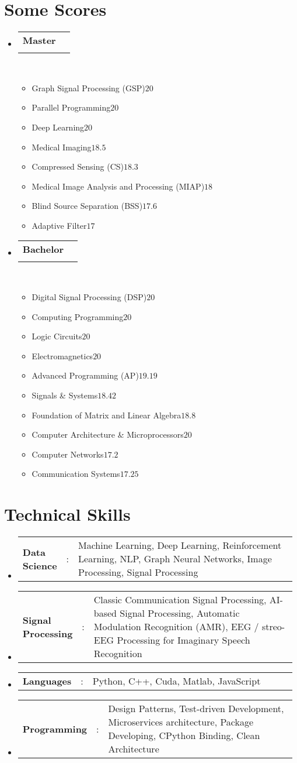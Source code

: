 \documentclass[a4paper,11pt]{article}
\makeatletter
\newcommand{\resumeItemScore}[2]{\item[]\small#1\hfill#2}
\newcommand{\resumeItemListStart}{\begin{itemize}[rightmargin=0.11in]}
\newcommand{\resumeItemListEnd}{\end{itemize}}
\newcommand{\resumeSectionType}[3]{
\item\begin{tabular*}{0.96\textwidth}[t]{
p{0.15\linewidth}p{0.02\linewidth}p{0.81\linewidth}
}
\textbf{#1} & #2 & #3
\end{tabular*}\vspace{-2pt}
}
\newcommand{\resumeQuadHeading}[4]{
\item
\begin{tabular*}{0.96\textwidth}[t]{l@{\extracolsep{\fill}}r}
\textbf{#1} & #2 \\
\textit{\small#3} & \textit{\small #4} \\
\end{tabular*}
}
\newcommand{\resumeHeadingListStart}{
\begin{itemize}[leftmargin=0.15in, label={}]
}
\newcommand{\resumeHeadingListEnd}{\end{itemize}}
\makeatother
\begin{document}
\section{Some Scores}
%
\resumeHeadingListStart{}
\resumeQuadHeading{Master}{}{}{}\\\vspace{-1.5em}

\begin{multicols}{2}
\resumeItemListStart{}
\resumeItemScore{Graph Signal Processing (GSP)}{$20$}
\resumeItemScore{Parallel Programming}{$20$}
\resumeItemScore{Deep Learning}{$20$}
\resumeItemScore{Medical Imaging}{$18.5$}
\resumeItemScore{Compressed Sensing (CS)}{$18.3$}
\resumeItemScore{Medical Image Analysis and Processing (MIAP)}{$18$}
\resumeItemScore{Blind Source Separation (BSS)}{$17.6$}
\resumeItemScore{Adaptive Filter}{$17$}
\resumeItemListEnd{}
\end{multicols}


\resumeQuadHeading{Bachelor}{}{}{}\\\vspace{-1.5em}
\begin{multicols}{2}
\resumeItemListStart{}
\resumeItemScore{Digital Signal Processing (DSP)}{$20$}
\resumeItemScore{Computing Programming}{$20$}
\resumeItemScore{Logic Circuits}{$20$}
\resumeItemScore{Electromagnetics}{$20$}
\resumeItemScore{Advanced Programming (AP)}{$19.19$}
\resumeItemScore{Signals \& Systems}{$18.42$}
\resumeItemScore{Foundation of Matrix and Linear Algebra}{$18.8$}
\resumeItemScore{Computer Architecture \& Microprocessors}{$20$}
\resumeItemScore{Computer Networks}{$17.2$}
\resumeItemScore{Communication Systems}{$17.25$}
\resumeItemListEnd{}
\end{multicols}

\resumeHeadingListEnd{}


%



\section{Technical Skills}
\resumeHeadingListStart{}
\resumeSectionType{Data Science}{:}{Machine Learning, Deep Learning, Reinforcement Learning, NLP, Graph Neural Networks, Image Processing, Signal Processing}
\resumeSectionType{Signal Processing}{:}{Classic Communication Signal Processing, AI-based Signal Processing, Automatic Modulation Recognition (AMR), EEG / streo-EEG Processing for Imaginary Speech Recognition}
\resumeSectionType{Languages}{:}{Python, C++, Cuda, Matlab, JavaScript}
\resumeSectionType{Programming}{:}{Design Patterns, Test-driven Development, Microservices architecture, Package Developing, CPython Binding, Clean Architecture}
\resumeHeadingListEnd{}
\end{document}
